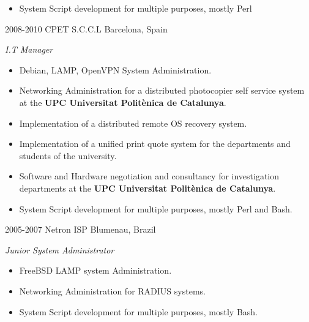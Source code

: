 \documentclass[]{friggeri-cv} %
\begin{document}
\begin{entrylist}
{\begin{itemize}
\item System Script development for multiple purposes, mostly Perl
\end{itemize}}
\entry
{2008-2010}
{CPET S.C.C.L}
{Barcelona, Spain}
{\emph{I.T Manager} \\
\begin{itemize}
\item Debian, LAMP, OpenVPN System Administration.
\item Networking Administration for a distributed photocopier self service system at the \textbf{UPC Universitat Politènica de Catalunya}.
\item Implementation of a distributed remote OS recovery system.
\item Implementation of a unified print quote system for the departments and students of the university.
\item Software and Hardware negotiation and consultancy for investigation departments at the \textbf{UPC Universitat Politènica de Catalunya}.
\item System Script development for multiple purposes, mostly Perl and Bash.
\end{itemize}}
\entry
{2005-2007}
{Netron ISP}
{Blumenau, Brazil}
{\emph{Junior System Administrator} \\
\begin{itemize}
\item FreeBSD LAMP system Administration.
\item Networking Administration for RADIUS systems.
\item System Script development for multiple purposes, mostly Bash.
\end{itemize}}
\end{entrylist}

\end{document}
